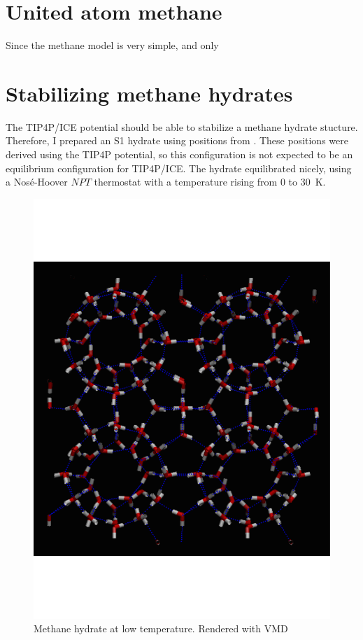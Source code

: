\section{United atom methane}
Since the methane model is very simple, and only

\section{Stabilizing methane hydrates}
The TIP4P/ICE potential should be able to stabilize a methane hydrate stucture. Therefore, I prepared an S1 hydrate using positions from \cite{Takeuchi2013}. These positions were derived using the TIP4P potential, so this configuration is not expected to be an equilibrium configuration for TIP4P/ICE. The hydrate equilibrated nicely, using a Nosé-Hoover $NPT$ thermostat with a temperature rising from $0$ to \SI{30}{\kelvin}. 

\begin{figure}
\includegraphics[width=\textwidth]{../snapshots/first_stable_hydrate.pdf}
\caption{Methane hydrate at low temperature. Rendered with VMD}
\label{fig:part2:first_hydrate}
\end{figure}

